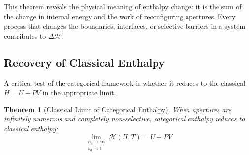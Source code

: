 \documentclass[12pt,a4paper]{article}
\newtheorem{theorem}{Theorem}[section]
\theoremstyle{definition}
\theoremstyle{remark}
\begin{document}
This theorem reveals the physical meaning of enthalpy change: it is the sum of the change in internal energy and the work of reconfiguring apertures. Every process that changes the boundaries, interfaces, or selective barriers in a system contributes to $\Delta\mathcal{H}$.

\subsection{Recovery of Classical Enthalpy}

A critical test of the categorical framework is whether it reduces to the classical $H = U + PV$ in the appropriate limit.

\begin{theorem}[Classical Limit of Categorical Enthalpy]
\label{thm:classical_limit}
When apertures are infinitely numerous and completely non-selective, categorical enthalpy reduces to classical enthalpy:
\begin{equation}
\lim_{\substack{n_a \to \infty \\ s_a \to 1}} \mathcal{H}(\Pi, T) = U + PV
\end{equation}
\end{theorem}
\end{document}
